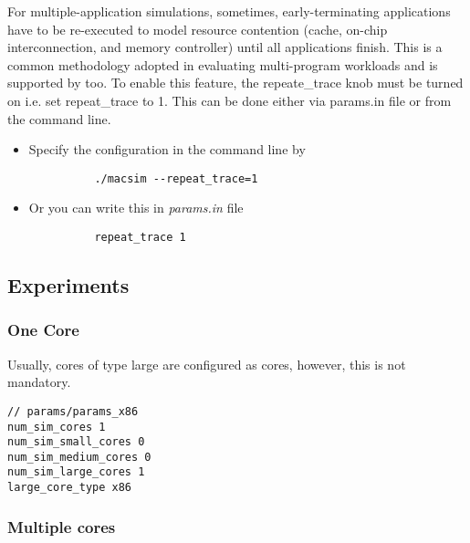 For multiple-application simulations, sometimes, early-terminating applications
have to be re-executed to model resource contention (cache, on-chip
interconnection, and memory controller) until all applications finish. This
is a common methodology adopted in evaluating multi-program workloads and is
supported by \SIM too. To enable this feature, the repeate\_trace knob must be
turned on i.e. set repeat\_trace to 1. This can be done either via params.in
file or from the command line. 

\ignore
		{
		\begin{itemize}
		  \item Specify the configuration in the command line by
		  \begin{Verbatim}
		  ./macsim --repeat_trace=1
		  \end{Verbatim}

		  \item Or you can write this in \textit{params.in} file
		  \begin{Verbatim}
		  repeat_trace 1
		  \end{Verbatim}
		\end{itemize}
		}



\subsection{\cpu Experiments}


\subsubsection{One \cpu Core}

Usually, cores of type large are configured as \cpu cores, however, this is not
mandatory. 

\begin{Verbatim}
// params/params_x86
num_sim_cores 1
num_sim_small_cores 0
num_sim_medium_cores 0
num_sim_large_cores 1
large_core_type x86
\end{Verbatim}


\subsubsection{Multiple \cpu cores}

